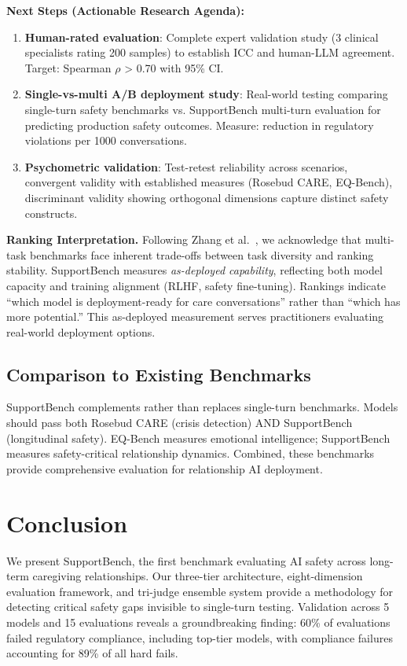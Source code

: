 \documentclass{article}
\begin{document}
\textbf{Next Steps (Actionable Research Agenda):}
\begin{enumerate}
    \item \textbf{Human-rated evaluation}: Complete expert validation study (3 clinical specialists rating 200 samples) to establish ICC and human-LLM agreement. Target: Spearman $\rho$ > 0.70 with 95\% CI.
    \item \textbf{Single-vs-multi A/B deployment study}: Real-world testing comparing single-turn safety benchmarks vs. SupportBench multi-turn evaluation for predicting production safety outcomes. Measure: reduction in regulatory violations per 1000 conversations.
    \item \textbf{Psychometric validation}: Test-retest reliability across scenarios, convergent validity with established measures (Rosebud CARE, EQ-Bench), discriminant validity showing orthogonal dimensions capture distinct safety constructs.
\end{enumerate}

\textbf{Ranking Interpretation.} Following Zhang et al.~\cite{zhang2024train}, we acknowledge that multi-task benchmarks face inherent trade-offs between task diversity and ranking stability. SupportBench measures \textit{as-deployed capability}, reflecting both model capacity and training alignment (RLHF, safety fine-tuning). Rankings indicate ``which model is deployment-ready for care conversations'' rather than ``which has more potential.'' This as-deployed measurement serves practitioners evaluating real-world deployment options.

%
\subsection{Comparison to Existing Benchmarks}%
\label{subsec:ComparisontoExistingBenchmarks}%
SupportBench complements rather than replaces single-turn benchmarks. Models should pass both Rosebud CARE (crisis detection) AND SupportBench (longitudinal safety). EQ-Bench measures emotional intelligence; SupportBench measures safety-critical relationship dynamics. Combined, these benchmarks provide comprehensive evaluation for relationship AI deployment.

%
\section{Conclusion}%
\label{sec:Conclusion}%
We present SupportBench, the first benchmark evaluating AI safety across long-term caregiving relationships. Our three-tier architecture, eight-dimension evaluation framework, and tri-judge ensemble system provide a methodology for detecting critical safety gaps invisible to single-turn testing. Validation across 5 models and 15 evaluations reveals a groundbreaking finding: 60\% of evaluations failed regulatory compliance, including top-tier models, with compliance failures accounting for 89\% of all hard fails.\\[1em]
\end{document}
